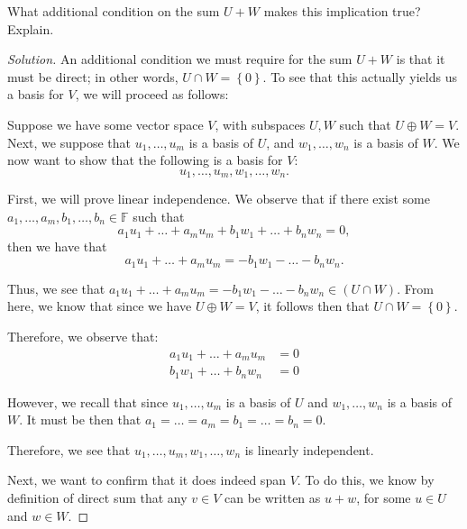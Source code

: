 \documentclass{article}
\newenvironment{solution}{\begin{proof}[Solution]}{\end{proof}}
\begin{document}
	\begin{hw}
		What additional condition on the sum $U+W$ makes this implication true? Explain.
	\end{hw}
	\begin{solution}
		An additional condition we must require for the sum $U + W$ is that it must be direct; in other words, $U \cap W = \left\{  0 \right\}$. To see that this actually yields us a basis for $V$, we will proceed as follows:
		
		Suppose we have some vector space $V$, with subspaces $U, W$ such that $U \oplus W = V$. Next, we suppose that $u_{1}, \ldots, u_{m}$ is a basis of $U$, and $w_{1}, \ldots, w_{n}$ is a basis of $W$. We now want to show that the following is a basis for $V$:
		\begin{equation*}
			u_{1}, \ldots, u_{m}, w_{1}, \ldots, w_{n}.
		\end{equation*}
		
		First, we will prove linear independence. We observe that if there exist some $a_{1}, \ldots, a_{m}, b_{1}, \ldots, b_{n} \in \mathbb{F}$ such that
		\begin{equation*}
			a_{1}u_{1} + \ldots + a_{m}u_{m} + b_{1}w_{1} + \ldots + b_{n}w_{n} = 0,
		\end{equation*}
		then we have that
		\begin{equation*}
			a_{1}u_{1} + \ldots + a_{m}u_{m} = -b_{1}w_{1} - \ldots - b_{n}w_{n}.
		\end{equation*}
		
		Thus, we see that $a_{1}u_{1} + \ldots + a_{m}u_{m} = -b_{1}w_{1} - \ldots - b_{n}w_{n} \in (U \cap W)$. From here, we know that since we have $U \oplus W = V$, it follows then that $U \cap W = \left\{  0 \right\}$.
		
		Therefore, we observe that:
		\begin{align*}
			a_{1}u_{1} + \ldots + a_{m}u_{m} &= 0 \\
			b_{1}w_{1} + \ldots + b_{n}w_{n} &= 0
		\end{align*}
		
		However, we recall that since $u_{1}, \ldots, u_{m}$ is a basis of $U$ and $w_{1}, \ldots, w_{n}$ is a basis of $W$. It must be then that $a_{1} = \ldots = a_{m} = b_{1} = \ldots = b_{n} = 0$.
		
		Therefore, we see that $u_{1}, \ldots, u_{m}, w_{1}, \ldots, w_{n}$ is linearly independent.
		
		Next, we want to confirm that it does indeed span $V$. To do this, we know by definition of direct sum that any $v \in V$ can be written as $u + w$, for some $u \in U$ and $w \in W$.
		

\end{solution}
\end{document}
